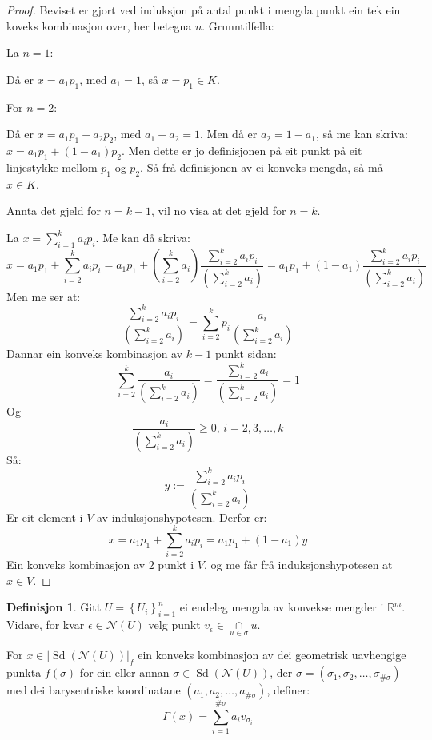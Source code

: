 \documentclass[a4paper, 12pt, norsk]{article}
\theoremstyle{plain}
\theoremstyle{definition}
\newtheorem{definition}[theorem]{Definisjon}
\newcommand{\Rb}{\mathbb{R}}
\newcommand{\Nc}{\mathcal{N}}
\newcommand{\intersect}{ \mathop{\cap}\limits } %
\newcommand{\gr}[1]{ \lvert #1 \rvert } %
\newcommand{\set}[1]{ \left \{ #1 \right \} } %
\newcommand{\tuple}[1]{ \left( #1 \right) } %
\DeclareMathOperator{\Sd}{Sd}
\begin{document}
\begin{proof}
	Beviset er gjort ved induksjon på antal punkt i mengda punkt ein tek ein koveks kombinasjon over, her betegna \( n \).
	Grunntilfella:

	La \( n = 1 \):
	
	Då er \( x = a_1 p_1 \), med \( a_1 = 1 \), så \( x = p_1 \in K \).
	
	For \( n = 2 \):

	Då er \( x = a_1 p_1 + a_2 p_2 \), med \( a_1 + a_2 = 1 \). Men då er \( a_2 = 1 - a_1 \), så me kan skriva: \( x = a_1 p_1 + (1-a_1) p_2 \). Men dette er jo definisjonen på eit punkt på eit linjestykke mellom \( p_1 \) og \( p_2 \). Så frå definisjonen av ei konveks mengda, så må \( x \in K \).

	Annta det gjeld for \( n = k-1 \), vil no visa at det gjeld for \( n = k \).

	La \( x = \sum_{i=1}^k a_i p_i \). Me kan då skriva:
	\[ 
		x = a_1 p_1 + \sum_{i=2}^k a_i p_i = a_1 p_1 + (\sum_{i=2}^k a_i) \frac{\sum_{i=2}^k a_i p_i}{(\sum_{i=2}^k a_i)} = a_1 p_1 + (1-a_1) \frac{\sum_{i=2}^k a_i p_i}{(\sum_{i=2}^k a_i)}
	\]
	Men me ser at:
	\[
		\frac{\sum_{i=2}^k a_i p_i}{(\sum_{i=2}^k a_i)} = \sum_{i=2}^k p_i\frac{a_i}{(\sum_{i=2}^k a_i)}
	\]
	Dannar ein konveks kombinasjon av \( k-1 \) punkt sidan:
	\[
		\sum_{i=2}^k \frac{a_i}{(\sum_{i=2}^k a_i)} = \frac{\sum_{i=2}^k a_i}{(\sum_{i=2}^k a_i)} = 1
	\]
	Og
	\[
		\frac{a_i}{(\sum_{i=2}^k a_i)} \geq 0, \, i=2,3,\dots,k
	\]
	Så:
	\[
		y := \frac{\sum_{i=2}^k a_i p_i}{(\sum_{i=2}^k a_i)}
	\]
	Er eit element i \( V \) av induksjonshypotesen. Derfor er:
	\[
		x = a_1 p_1 + \sum_{i=2}^k a_i p_i = a_1 p_1 + (1-a_1) y
	\]
	Ein konveks kombinasjon av \( 2 \) punkt i \( V \), og me får frå induksjonshypotesen at \( x \in V \).
\end{proof}

\begin{definition} \label{thm:Gamma} %
	Gitt \( U = \set{U_i}_{i=1}^n \) ei endeleg mengda av konvekse mengder i \( \Rb^m \). Vidare, for kvar \( \epsilon \in \Nc(U) \) velg punkt \( v_\epsilon \in \intersect_{u \in \sigma} u \).

	For \( x \in \gr{\Sd(\Nc(U))}_f \) ein konveks kombinasjon av dei geometrisk uavhengige punkta \( f(\sigma) \) for ein eller annan \( \sigma \in \Sd(\Nc(U)) \), der \( \sigma = \tuple{\sigma_1, \sigma_2, \dots, \sigma_{\#\sigma}} \) med dei barysentriske koordinatane \( \tuple{a_1, a_2, \dots, a_{\#\sigma}} \), definer:
	\[
		\Gamma(x) = \sum_{i=1}^{\#\sigma} a_i v_{\sigma_i}
	\]
\end{definition}
\end{document}
